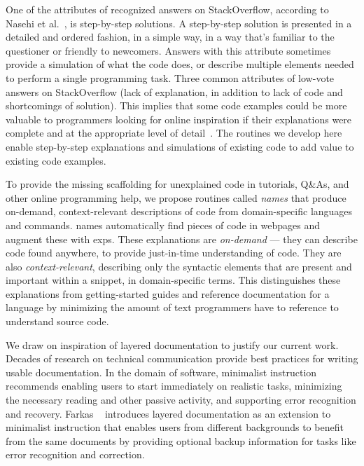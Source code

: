 \begin{changes}
One of the attributes of recognized answers on StackOverflow, according to Nasehi et al.~\cite{nasehi_what_2012}, is step-by-step solutions.
A step-by-step solution is presented in a detailed and ordered fashion, in a simple way, in a way that's familiar to the questioner or friendly to newcomers.
Answers with this attribute sometimes provide a simulation of what the code does, or describe multiple elements needed to perform a single programming task. 
Three common attributes of low-vote answers on StackOverflow (lack of explanation, in addition to lack of code and shortcomings of solution).
This implies that some code examples could be more valuable to programmers looking for online inspiration if their explanations were complete and at the appropriate level of detail~\cite{nasehi_what_2012}.
\fi
The routines we develop here enable step-by-step explanations and simulations of existing code to add value to existing code examples.
\end{changes}

To provide the missing scaffolding for unexplained code in tutorials, Q\&As, and other online programming help, we propose routines called \emph{\Glspl{name}} that produce on-demand, context-relevant descriptions of code from domain-specific languages and commands.
\Glspl{name} automatically find pieces of code in webpages and augment these with \glspl{exp}.
These explanations are \emph{on-demand} --- they can describe code found anywhere, to provide just-in-time understanding of code.
They are also \emph{context-relevant}, describing only the syntactic elements that are present and important within a snippet, in domain-specific terms.
This distinguishes these explanations from getting-started guides and reference documentation for a language by minimizing the amount of text programmers have to reference to understand source code.

We draw on inspiration of layered documentation to justify our current work. 
Decades of research on technical communication provide best practices for writing usable documentation.
In the domain of software, minimalist instruction~\cite{carroll_nurnberg_1990} recommends enabling users to start immediately on realistic tasks, minimizing the necessary  reading and other passive activity, and supporting error recognition and recovery.
Farkas ~\cite{farkas_layering_1998} introduces layered documentation as an extension to minimalist instruction that enables users from different backgrounds to benefit from the same documents by providing optional backup information for tasks like error recognition and correction.
\fi 

